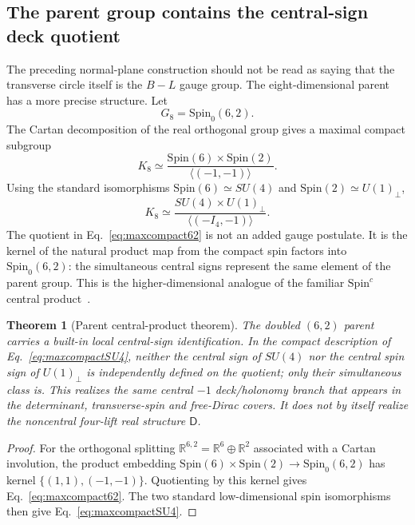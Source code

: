 \documentclass[11pt]{article}
\newtheorem{theorem}{Theorem}[section]
\theoremstyle{definition}\newtheorem{definition}[theorem]{Definition}
\theoremstyle{remark}\newtheorem{remark}[theorem]{Remark}\newtheorem{conjecture}[theorem]{Conjecture}
\begin{document}
\subsection{The parent group contains the central-sign deck quotient}\label{subsec:parentcentralproduct}
The preceding normal-plane construction should not be read as saying that the transverse circle itself is the $B-L$ gauge group. The eight-dimensional parent has a more precise structure. Let
\begin{equation}
 G_8=\mathrm{Spin}_0(6,2).
\end{equation}
The Cartan decomposition of the real orthogonal group gives a maximal compact subgroup
\begin{equation}\label{eq:maxcompact62}
 \boxed{
 K_8\simeq
 \frac{\mathrm{Spin}(6)\times\mathrm{Spin}(2)}
 {\langle(-1,-1)\rangle}.}
\end{equation}
Using the standard isomorphisms $\mathrm{Spin}(6)\simeq SU(4)$ and $\mathrm{Spin}(2)\simeq U(1)_\perp$,
\begin{equation}\label{eq:maxcompactSU4}
 \boxed{
 K_8\simeq
 \frac{SU(4)\times U(1)_\perp}
 {\langle(-I_4,-1)\rangle}.}
\end{equation}
The quotient in Eq.~\eqref{eq:maxcompact62} is not an added gauge postulate. It is the kernel of the natural product map from the compact spin factors into $\mathrm{Spin}_0(6,2)$: the simultaneous central signs represent the same element of the parent group. This is the higher-dimensional analogue of the familiar $\mathrm{Spin}^c$ central product~\cite{Helgason1978,LawsonMichelsohn1989}.

\begin{theorem}[Parent central-product theorem]\label{thm:parentcentralproduct}
The doubled $(6,2)$ parent carries a built-in local \emph{central-sign} identification. In the compact description of Eq.~\eqref{eq:maxcompactSU4}, neither the central sign of $SU(4)$ nor the central spin sign of $U(1)_\perp$ is independently defined on the quotient; only their simultaneous class is. This realizes the same central $-1$ deck/holonomy branch that appears in the determinant, transverse-spin and free-Dirac covers. It does \emph{not} by itself realize the noncentral four-lift real structure $\mathsf D$.
\end{theorem}
\begin{proof}
For the orthogonal splitting $\mathbb R^{6,2}=\mathbb R^6\oplus\mathbb R^2$ associated with a Cartan involution, the product embedding $\mathrm{Spin}(6)\times\mathrm{Spin}(2)\to\mathrm{Spin}_0(6,2)$ has kernel $\{(1,1),(-1,-1)\}$. Quotienting by this kernel gives Eq.~\eqref{eq:maxcompact62}. The two standard low-dimensional spin isomorphisms then give Eq.~\eqref{eq:maxcompactSU4}.
\end{proof}
\end{document}
